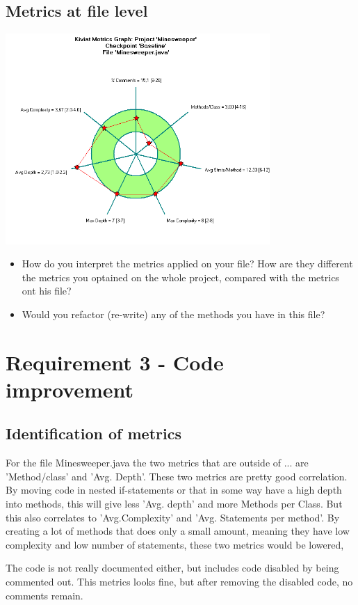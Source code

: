 \documentclass[UKenglish]{article}  %
\begin{document}
\subsection{Metrics at file level}
\includegraphics[height=8cm]{kiviat_diagram_minesweeper}
\begin{itemize}
\item How do you interpret the metrics applied on your file? How are they different the metrics you optained on the whole project, compared with the metrics ont his file?\\
\item Would you refactor (re-write) any of the methods you have in this file?
\end{itemize}
\section{Requirement 3 - Code improvement}
\subsection{Identification of metrics}
For the file Minesweeper.java the two metrics that are outside of ... are 
'Method/class' and 'Avg. Depth'. These two metrics are pretty good correlation.
By moving code in nested if-statements or that in some way have a high depth 
into methods, this will give less 'Avg. depth' and more Methods per Class. 
But this also correlates to 'Avg.Complexity' and 'Avg. Statements per method'.
By creating a lot of methods that does only a small amount, meaning they have
low complexity and low number of statements, these two metrics would be lowered,

The code is not really documented either, but includes code disabled by being
commented out. This metrics looks fine, but after removing the disabled code,
no comments remain.
\end{document}
